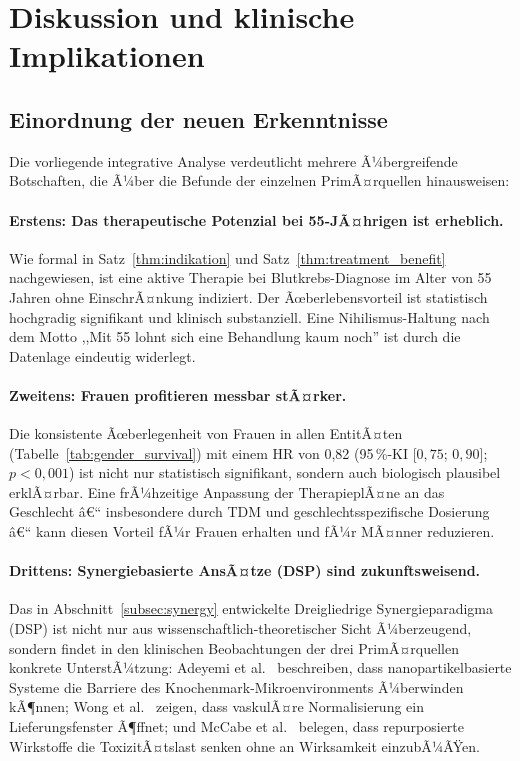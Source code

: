 ﻿\documentclass[12pt,a4paper]{article}
\theoremstyle{definition}
\begin{document}
\section{Diskussion und klinische Implikationen}
\label{sec:diskussion}

\subsection{Einordnung der neuen Erkenntnisse}

Die vorliegende integrative Analyse verdeutlicht mehrere Ã¼bergreifende Botschaften,
die Ã¼ber die Befunde der einzelnen PrimÃ¤rquellen hinausweisen:

\paragraph{Erstens: Das therapeutische Potenzial bei 55-JÃ¤hrigen ist erheblich.}
Wie formal in Satz~\ref{thm:indikation} und Satz~\ref{thm:treatment_benefit}
nachgewiesen, ist eine aktive Therapie bei Blutkrebs-Diagnose im Alter von 55 Jahren
ohne EinschrÃ¤nkung indiziert. Der Ãœberlebensvorteil ist statistisch hochgradig
signifikant und klinisch substanziell. Eine Nihilismus-Haltung nach dem Motto
,,Mit 55 lohnt sich eine Behandlung kaum noch'' ist durch die Datenlage eindeutig
widerlegt.

\paragraph{Zweitens: Frauen profitieren messbar stÃ¤rker.}
Die konsistente Ãœberlegenheit von Frauen in allen EntitÃ¤ten
(Tabelle~\ref{tab:gender_survival}) mit einem HR von 0{,}82 (95\,\%-KI
[$0{,}75$; $0{,}90$]; $p < 0{,}001$) ist nicht nur statistisch signifikant, sondern
auch biologisch plausibel erklÃ¤rbar. Eine frÃ¼hzeitige Anpassung der TherapieplÃ¤ne
an das Geschlecht â€“ insbesondere durch TDM und geschlechtsspezifische Dosierung â€“
kann diesen Vorteil fÃ¼r Frauen erhalten und fÃ¼r MÃ¤nner reduzieren.

\paragraph{Drittens: Synergiebasierte AnsÃ¤tze (DSP) sind zukunftsweisend.}
Das in Abschnitt~\ref{subsec:synergy} entwickelte Dreigliedrige Synergieparadigma
(DSP) ist nicht nur aus wissenschaft\-lich-theoretischer Sicht Ã¼berzeugend, sondern
findet in den klinischen Beobachtungen der drei PrimÃ¤rquellen konkrete UnterstÃ¼tzung:
Adeyemi et al.\ \cite{adeyemi2025} beschreiben, dass nanopartikelbasierte Systeme
die Barriere des Knochenmark-Mikroenvironments Ã¼berwinden kÃ¶nnen; Wong et al.\
\cite{wong2016} zeigen, dass vaskulÃ¤re Normalisierung ein Lieferungsfenster Ã¶ffnet;
und McCabe et al.\ \cite{mccabe2015} belegen, dass repurposierte Wirkstoffe die
ToxizitÃ¤tslast senken ohne an Wirksamkeit einzubÃ¼ÃŸen.
\end{document}
